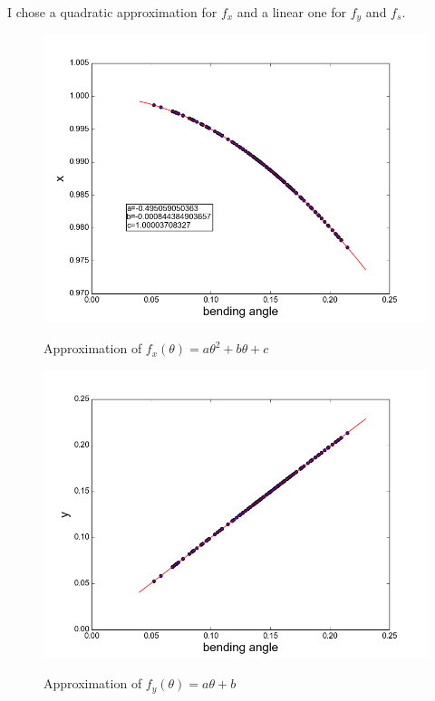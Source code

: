 \documentclass[11pt]{report}
\begin{document}
I chose a quadratic approximation for $f_x$ and a linear one for $f_y$ and $f_s$.
\begin{figure}[H]
    \begin{center}
        \includegraphics[scale=0.5]{images/newmodelx.png}
        \label{fig:newmodelX}
        \caption{Approximation of $f_x(\theta) = a\theta^2 + b\theta + c$}
    \end{center}
\end{figure}

\begin{figure}[H]
    \begin{center}
        \includegraphics[scale=0.5]{images/newmodely.png}
        \label{fig:newmodelY}
        \caption{Approximation of $f_y(\theta) = a\theta+b$}
    \end{center}
\end{figure}
\end{document}
